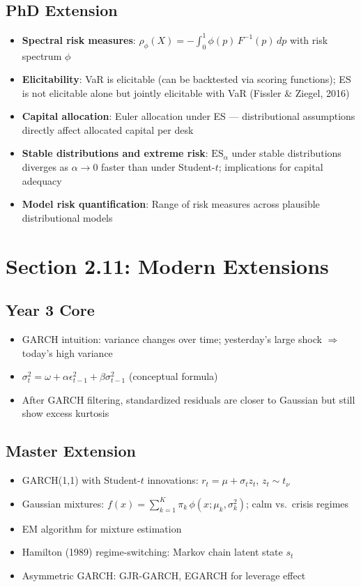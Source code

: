 \documentclass[11pt, a4paper]{article}
\theoremstyle{definition}
\begin{document}
\subsection{PhD Extension}
\begin{itemize}
  \item \textbf{Spectral risk measures}: $\rho_\phi(X) = -\int_0^1 \phi(p)\,F^{-1}(p)\,dp$ with risk spectrum $\phi$
  \item \textbf{Elicitability}: VaR is elicitable (can be backtested via scoring functions); ES is not elicitable alone but jointly elicitable with VaR (Fissler \& Ziegel, 2016)
  \item \textbf{Capital allocation}: Euler allocation under ES — distributional assumptions directly affect allocated capital per desk
  \item \textbf{Stable distributions and extreme risk}: $\text{ES}_\alpha$ under stable distributions diverges as $\alpha \to 0$ faster than under Student-$t$; implications for capital adequacy
  \item \textbf{Model risk quantification}: Range of risk measures across plausible distributional models
\end{itemize}

\section{Section 2.11: Modern Extensions}

\subsection{Year 3 Core}
\begin{itemize}
  \item GARCH intuition: variance changes over time; yesterday's large shock $\Rightarrow$ today's high variance
  \item $\sigma_t^2 = \omega + \alpha\epsilon_{t-1}^2 + \beta\sigma_{t-1}^2$ (conceptual formula)
  \item After GARCH filtering, standardized residuals are closer to Gaussian but still show excess kurtosis
\end{itemize}

\subsection{Master Extension}
\begin{itemize}
  \item GARCH(1,1) with Student-$t$ innovations: $r_t = \mu + \sigma_t z_t$, $z_t \sim t_\nu$
  \item Gaussian mixtures: $f(x) = \sum_{k=1}^K \pi_k\,\phi(x;\mu_k, \sigma_k^2)$; calm vs.\ crisis regimes
  \item EM algorithm for mixture estimation
  \item Hamilton (1989) regime-switching: Markov chain latent state $s_t$
  \item Asymmetric GARCH: GJR-GARCH, EGARCH for leverage effect
\end{itemize}
\end{document}
